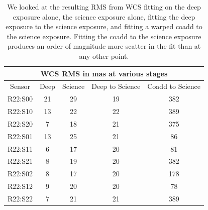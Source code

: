 \documentclass[prd, nofootinbib, floatfix, 11pt,tightenlines,times]{article}
\begin{document}
\clearpage
\begin{table}
\centering
\begin{tabular}{|c|c|c|c|c|}
\hline
\multicolumn{5}{|c|}{WCS RMS in mas at various stages} \\
\hline
Sensor    & Deep & Science &  Deep to Science & Coadd to Science \\
\hline
R22:S00&21&29&19&382\\ 
R22:S10&13&22&22&389\\
R22:S20&7&18&21&375\\
R22:S01&13&25&21&86\\
R22:S11&6&17&20&81\\
R22:S21&8&19&20&382\\
R22:S02&8&17&20&178\\
R22:S12&9&20&20&78\\
R22:S22&7&21&21&389\\
\hline
\end{tabular}
\caption{We looked at the resulting RMS from WCS fitting on the deep exposure alone, the science exposure alone,
fitting the deep exposure to the science exposure, and fitting a warped coadd to the science exposure.  Fitting 
the coadd to the science exposure produces an order of magnitude more scatter in the fit than at any other point.\label{tab-wcsrms}}
\end{table}
\clearpage
\end{document}
